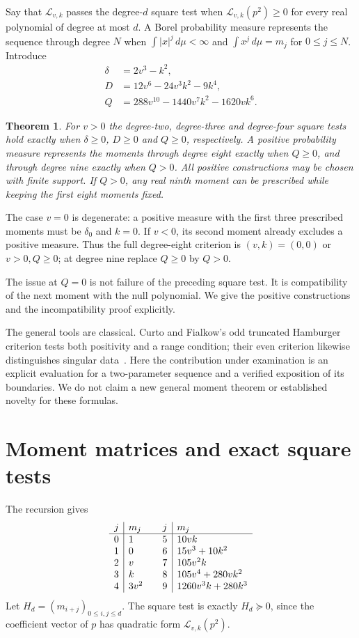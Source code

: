 \documentclass[11pt]{article}
\newtheorem{theorem}{Theorem}[section]
\newcommand{\Lk}{\mathcal L_{v,k}}
\begin{document}
Say that $\Lk$ passes the degree-$d$ square test when
$\Lk(p^2)\geq0$ for every real polynomial of degree at
most $d$. A Borel probability measure represents the
sequence through degree $N$ when $\int |x|^j\,d\mu<\infty$
and $\int x^j\,d\mu=m_j$ for $0\leq j\leq N$.
Introduce
\begin{equation}\label{eq:determinants}
 \begin{split}
 \delta&=2v^3-k^2,\\
 D&=12v^6-24v^3k^2-9k^4,\\
 Q&=288v^{10}-1440v^7k^2-1620vk^6.
 \end{split}
\end{equation}

\begin{theorem}\label{thm:classification}
For $v>0$ the degree-two, degree-three and degree-four
square tests hold exactly when $\delta\geq0$, $D\geq0$
and $Q\geq0$, respectively. A positive probability measure
represents the moments through degree eight exactly when
$Q\geq0$, and through degree nine exactly when $Q>0$.
All positive constructions may be chosen with finite support.
If $Q>0$, any real ninth moment can be prescribed while
keeping the first eight moments fixed.
\end{theorem}

The case $v=0$ is degenerate: a positive measure with the
first three prescribed moments must be $\delta_0$ and
$k=0$. If $v<0$, its second moment already excludes a
positive measure. Thus the full degree-eight criterion is
$(v,k)=(0,0)$ or $v>0,Q\geq0$; at degree nine replace
$Q\geq0$ by $Q>0$.

The issue at $Q=0$ is not failure of the preceding square
test. It is compatibility of the next moment with the
null polynomial. We give the positive constructions and
the incompatibility proof explicitly.

The general tools are classical. Curto and Fialkow's
odd truncated Hamburger criterion tests both positivity
and a range condition; their even criterion likewise
distinguishes singular data~\cite{curtofialkow}.
Here the contribution under examination is an explicit
evaluation for a two-parameter sequence and a verified
exposition of its boundaries. We do not claim a new
general moment theorem or established novelty for these formulas.

\section{Moment matrices and exact square tests}
The recursion gives
\begin{equation}\label{eq:table}
\begin{array}{c|l@{\qquad}c|l}
 j&m_j&j&m_j\\\hline
0&1&5&10vk\\
1&0&6&15v^3+10k^2\\
2&v&7&105v^2k\\
3&k&8&105v^4+280vk^2\\
4&3v^2&9&1260v^3k+280k^3
\end{array}
\end{equation}
Let $H_d=(m_{i+j})_{0\leq i,j\leq d}$. The square test
is exactly $H_d\succeq0$, since the coefficient vector
of $p$ has quadratic form $\Lk(p^2)$.
\end{document}
